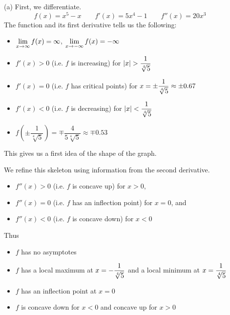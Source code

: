 \begin{solution}
(a)
First, we differentiate.
\[
f(x) = x^5-x\qquad
f'(x)=5x^4-1\qquad
f''(x)=20x^3\qquad
\]
The function and its first derivative tells us the following:
\begin{itemize}
\item $\displaystyle\lim_{x \to \infty} f(x)=\infty$, $\displaystyle\lim_{x \to -\infty} f(x)=-\infty$
\item $f'(x)> 0$ (i.e. $f$ is increasing) for
   $|x|> \dfrac{1}{\root{4}\of{5}}$
\item $f'(x)=0$ (i.e. $f$ has critical points) for $x= \pm\dfrac{1}{\root{4}\of{5}} \approx \pm 0.67$
\item $f'(x)< 0$ (i.e. $f$ is decreasing) for $|x| < \dfrac{1}{\root{4}\of{5}}$
\item $f\left(\pm\dfrac{1}{\sqrt[4]{5}}\right)=\mp\dfrac{4}{5\sqrt[4]{5}}\approx\mp0.53$
\end{itemize}
This gives us a first idea of the shape of the graph.
\begin{center}\end{center}
We refine this skeleton using information from the second derivative.
\begin{itemize}
\item $f''(x)> 0$ (i.e. $f$ is concave up) for $x> 0$,
\item{}$f''(x)=0$ (i.e. $f$ has an inflection point) for $x=0$, and
\item{}$f''(x)< 0$ (i.e. $f$ is concave down) for $x<0$
\end{itemize}
Thus
\begin{itemize}
\item $f$ has no asymptotes
\item $f$ has a local maximum at $x=-\dfrac{1}{\root{4}\of{5}}$
           and  a local minimum at $x=\dfrac{1}{\root{4}\of{5}}$
\item $f$ has an inflection point at $x=0$
\item $f$ is concave down for $x<0$ and concave up for $x>0$
\end{itemize}


\end{solution}
